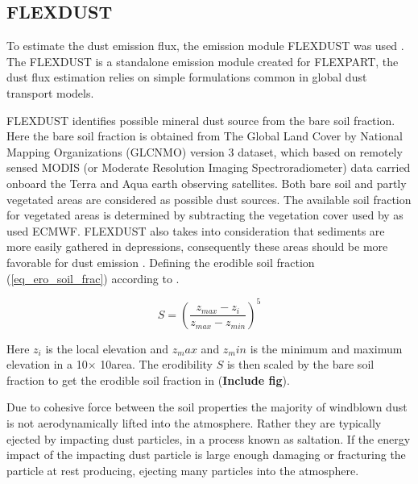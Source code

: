 \subsection{FLEXDUST}
To estimate the dust emission flux, the emission module FLEXDUST was used   
\parencite{flexdust_ref_2016}. The FLEXDUST is a standalone emission module
created for FLEXPART, the dust flux estimation relies on simple formulations
common in global dust transport models. 

FLEXDUST identifies possible mineral dust source from the bare soil fraction.
Here the bare soil fraction is obtained from The Global Land Cover by National
Mapping Organizations (GLCNMO) version 3 \parencite{shirahata2017production}
dataset, which based on remotely sensed MODIS (or Moderate Resolution Imaging
Spectroradiometer) data carried onboard the Terra and Aqua earth observing
satellites. Both bare soil and partly vegetated areas are considered as possible
dust sources. The available soil fraction for vegetated areas is determined by
subtracting the vegetation cover used by as used ECMWF. FLEXDUST also takes into
consideration that sediments are more easily gathered in depressions,
consequently these areas should be more favorable for dust emission
\parencite{zender2003mineral}. Defining the erodible soil fraction
(\cref{eq_ero_soil_frac}) according to \textcite{dust_dist_Ginoux2001}.

\begin{equation}\label{eq_ero_soil_frac}
    S = \left(\frac{z_{max} - z_i}{z_{max} - z_{min}}\right)^5 
\end{equation}    

Here $z_i$ is the local elevation and $z_max$ and $z_min$ is the minimum and
maximum elevation in a 10\degree $\times$ 10\degree area. The erodibility $S$ is
then scaled by the bare soil fraction to get the erodible soil fraction in (\textbf{Include fig}). 

Due to cohesive force between the soil properties the majority of windblown dust
is not aerodynamically lifted into the atmosphere. Rather they are typically
ejected by impacting dust particles, in a process known as saltation. If the energy impact of the 
impacting dust particle is large enough damaging or fracturing the particle at rest producing, ejecting many particles into the atmosphere. 
 